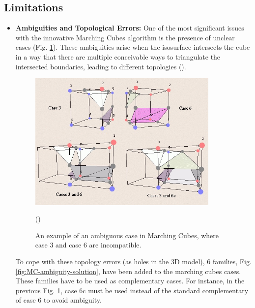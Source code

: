 \subsection{Limitations} 
\begin{itemize}
\item \textbf{Ambiguities and Topological Errors:}
One of the most significant issues with the innovative Marching Cubes algorithm is the presence of unclear cases (Fig. \ref{fig:MC-ambiguity}). These ambiguities arise when the isosurface intersects the cube in a way that there are multiple conceivable ways to triangulate the intersected boundaries, leading to different topologies (\cite{Nielson_1991}).

\begin{figure}
\centering
\includegraphics[height=0.55\textwidth,width=0.88\textwidth]{Figures/MC-Ambiguity-3D.jpeg}
\decoRule
\caption{An example of an ambiguous case in Marching Cubes, where case 3 and case 6 are incompatible.} (\cite{Lingrand_2003})
\label{fig:MC-ambiguity}
\end{figure}

To cope with these topology errors (as holes in the 3D model), 6 families, Fig. \ref{fig:MC-ambiguity-solution}, have been added to the marching cubes cases. These families have to be used as complementary cases. For instance, in the previous Fig. \ref{fig:MC-ambiguity}, case 6c must be used instead of the standard complementary of case 6 to avoid ambiguity.


\end{itemize}
